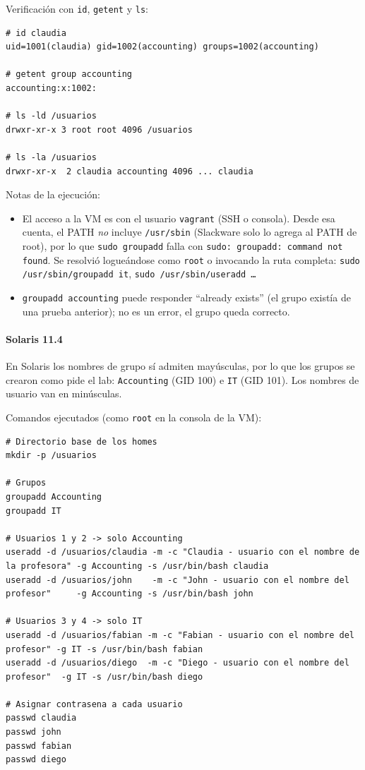 \documentclass[11pt,a4paper]{report}
\begin{document}
Verificación con \texttt{id}, \texttt{getent} y \texttt{ls}:

\begin{lstlisting}[language={}]
# id claudia
uid=1001(claudia) gid=1002(accounting) groups=1002(accounting)

# getent group accounting
accounting:x:1002:

# ls -ld /usuarios
drwxr-xr-x 3 root root 4096 /usuarios

# ls -la /usuarios
drwxr-xr-x  2 claudia accounting 4096 ... claudia
\end{lstlisting}

Notas de la ejecución:

\begin{itemize}
  \item El acceso a la VM es con el usuario \texttt{vagrant} (SSH o consola). Desde esa cuenta, el PATH \emph{no} incluye \texttt{/usr/sbin} (Slackware solo lo agrega al PATH de root), por lo que \texttt{sudo groupadd} falla con \texttt{sudo: groupadd: command not found}. Se resolvió logueándose como \texttt{root} o invocando la ruta completa: \texttt{sudo /usr/sbin/groupadd it}, \texttt{sudo /usr/sbin/useradd \ldots}
  \item \texttt{groupadd accounting} puede responder ``already exists'' (el grupo existía de una prueba anterior); no es un error, el grupo queda correcto.
\end{itemize}

\paragraph*{Solaris 11.4}

En Solaris los nombres de grupo sí admiten mayúsculas, por lo que los grupos se crearon como pide el lab: \texttt{Accounting} (GID 100) e \texttt{IT} (GID 101). Los nombres de usuario van en minúsculas.

Comandos ejecutados (como \texttt{root} en la consola de la VM):

\begin{lstlisting}
# Directorio base de los homes
mkdir -p /usuarios

# Grupos
groupadd Accounting
groupadd IT

# Usuarios 1 y 2 -> solo Accounting
useradd -d /usuarios/claudia -m -c "Claudia - usuario con el nombre de la profesora" -g Accounting -s /usr/bin/bash claudia
useradd -d /usuarios/john    -m -c "John - usuario con el nombre del profesor"     -g Accounting -s /usr/bin/bash john

# Usuarios 3 y 4 -> solo IT
useradd -d /usuarios/fabian -m -c "Fabian - usuario con el nombre del profesor" -g IT -s /usr/bin/bash fabian
useradd -d /usuarios/diego  -m -c "Diego - usuario con el nombre del profesor"  -g IT -s /usr/bin/bash diego

# Asignar contrasena a cada usuario
passwd claudia
passwd john
passwd fabian
passwd diego
\end{lstlisting}
\end{document}
